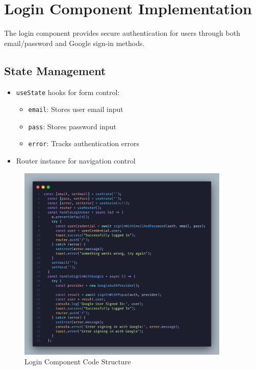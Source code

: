 \section{Login Component Implementation}

The login component provides secure authentication for users through both email/password and Google sign-in methods.

\subsection{State Management}
\begin{itemize}
    \item \texttt{useState} hooks for form control:
    \begin{itemize}
        \item \texttt{email}: Stores user email input
        \item \texttt{pass}: Stores password input
        \item \texttt{error}: Tracks authentication errors
    \end{itemize}
    \item Router instance for navigation control
\end{itemize}

\begin{figure}[H]
    \centering
    \includegraphics[width=0.9\textwidth]{./figures/implementation/login2.png}
    \caption{Login Component Code Structure}
    \label{fig:login_component}
\end{figure}

